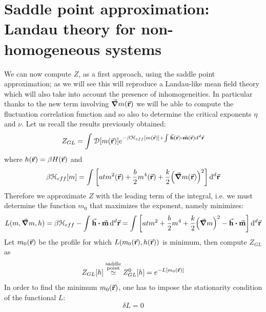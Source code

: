 \documentclass[../main/main.tex]{subfiles}
\begin{document}
\section{Saddle point approximation: Landau theory for non-homogeneous systems}
We can now compute \( Z \), as a first approach, using the saddle point approximation; as we will see this will reproduce a Landau-like mean field theory which will also take into account the presence of inhomogeneities. In particular thanks to the new term involving \( \va{\grad } m (\va{r}) \) we will be able to compute the fluctuation correlation function and so also to determine the critical exponents \( \eta  \) and \( \nu  \). Let us recall the results previously obtained:
\begin{equation*}
  Z_{GL} = \int_{}^{} \mathcal{D} \qty[m(\va{r})]  e^{-  \beta \mathcal{H}_{eff} [m (\va{r})]   + \int_{}^{} \va{h} (\va{r}) \vdot \va{m} (\va{r})  \dd[d]{\va{r}}   }
\end{equation*}
where \( h(\va{r}) = \beta H(\va{r}) \) and
\begin{equation*}
  \beta \mathcal{H}_{eff} [m] = \int_{}^{}  \qty[a t m^2 (\va{r}) + \frac{b}{2} m^4 (\va{r}) + \frac{k}{2} \qty(\va{\grad } m (\va{r}))^2] \dd[d]{\va{r}}
\end{equation*}
Therefore we approximate \( Z \) with the leading term of the integral, i.e. we must determine the function \( m_0 \)  that maximizes the exponent, namely minimizes:
\begin{equation}
  L (m,\va{\grad } m,h) =  \beta \mathcal{H}_{eff}   - \int_{}^{} \va{h}  \vdot \va{m}  \dd[d]{\va{r}} = \int_{}^{}  \qty[a t m^2  + \frac{b}{2} m^4 + \frac{k}{2} \qty(\va{\grad } m )^2 - \va{h}  \vdot \va{m} ] \dd[d]{\va{r}}
\end{equation}
 Let \( m_0 (\va{r}) \) be the profile for which \( L (m_0 (\va{r}), h (\va{r}) ) \) is minimum, then compute \( Z_{GL} \) as
\begin{equation}
  Z_{GL} [h] \overset{\substack{ \text{saddle} \\  \text{point} } }{\simeq } Z_{GL}^0 [h] = e^{- L [m_0 (\va{r})]}
\end{equation}
In order to find the minimum \( m_0 (\va{r}) \), one has to impose the stationarity condition of the functional \( L \): %
\begin{equation}
  \delta L = 0
  \label{eq:17_3}
\end{equation}
\end{document}
